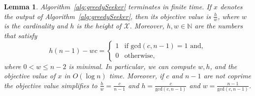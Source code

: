 \documentclass[11pt]{article}
\newtheorem{lemma}{Lemma}[section]
\newcommand\+{\mkern2mu}
\begin{document}
\begin{lemma}\label{lm:bezout}
Algorithm~\ref{alg:greedySeeker} terminates in finite time. If $x$ denotes the output of Algorithm~\ref{alg:greedySeeker}, then its objective value is $\frac{h}{w}$, where $w$ is the cardinality and $h$ is the height of $\mathcal{X}$. Moreover, $h,w\in\mathbb{N}$ are the numbers that satisfy
\begin{equation}
\label{eq:gcd}
h(n-1)-wc= \begin{cases} 1 & \text{if } \text{gcd}(c,n-1)= 1 \text{ and},\\
0 &\text{otherwise,}
\end{cases}
\end{equation}
where $0<w\le n-2$ is minimal.
In particular, we can compute $w,h$, and the objective value of $x$ in $O(\log n)$ time. Moreover, if $c$ and $n-1$ are not coprime the objective value simplifies to $\frac{h}{w}=\frac{c}{n-1}$ and $h=\frac{c}{\text{gcd}(c,n-1)}$ and $w=\frac{n-1}{\text{gcd}(c,n-1)}$.
\end{lemma}
\end{document}
